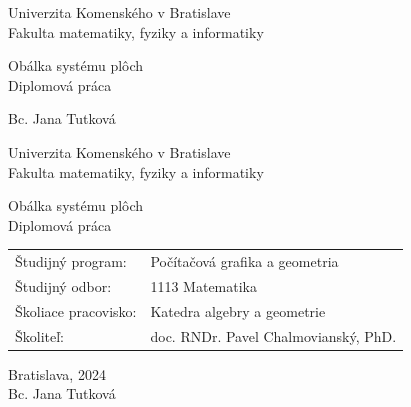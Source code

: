 \documentclass[12pt, twoside]{book}
\theoremstyle{definition}
\def\mfrok{2024}
\def\mfnazov{Obálka systému plôch}
\def\mftyp{Diplomová práca}
\def\mfautor{Bc. Jana Tutková}
\def\mfskolitel{doc. RNDr. Pavel Chalmovianský, PhD. }
\def\mfkonzultant{tit. Meno Priezvisko, tit. }
\def\mfmiesto{Bratislava, \mfrok}
\def\mfodbor{1113 Matematika}
\def\program{ Počítačová grafika a geometria }
\def\mfpracovisko{ Katedra algebry a geometrie }
\begin{document}
     
\frontmatter


\thispagestyle{empty}

\begin{center}
\sc\large
Univerzita Komenského v Bratislave\\
Fakulta matematiky, fyziky a informatiky

\vfill

{\LARGE\mfnazov}\\
\mftyp
\end{center}

\vfill

{\sc\large 
\noindent \mfrok \hfill
\mfautor
}

\eject %


\thispagestyle{empty}
\noindent

\begin{center}
\sc  
\large
Univerzita Komenského v Bratislave\\
Fakulta matematiky, fyziky a informatiky

\vfill

{\LARGE\mfnazov}\\
\mftyp
\end{center}

\vfill

\noindent
\begin{tabular}{ll}
Študijný program: & \program \\
Študijný odbor: & \mfodbor \\
Školiace pracovisko: & \mfpracovisko \\
Školiteľ: & \mfskolitel \\
\end{tabular}

\vfill


\noindent \mfmiesto\\
\mfautor

\eject %




\end{document}
